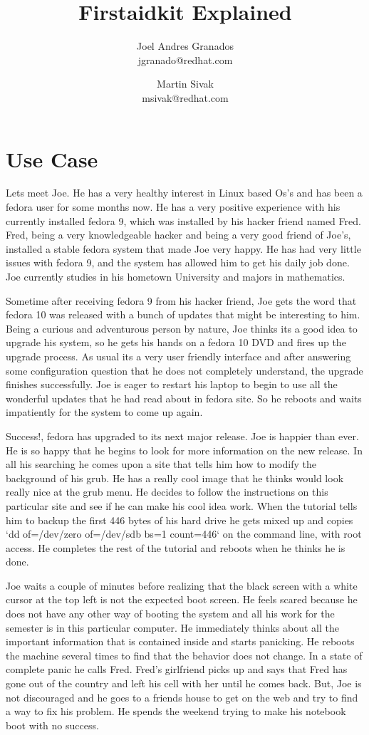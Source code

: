 \documentclass[a4paper,13pt]{article}
\title{Firstaidkit Explained}
\author{Joel Andres Granados \\ jgranado@redhat.com \and Martin Sivak \\ msivak@redhat.com}
\begin{document}
\maketitle

\section{Use Case}
Lets meet Joe.  He has a very healthy interest in Linux based Os's
and has been a fedora user for some months now.  He has a very positive
experience with his currently installed fedora 9, which was installed by his
hacker friend named Fred.  Fred, being a very knowledgeable hacker and being
a very good friend of Joe's, installed a stable fedora system that made Joe
very happy.  He has had very little issues with fedora 9, and the system has
allowed him to get his daily job done.  Joe currently studies in his hometown
University and majors in mathematics.

Sometime after receiving fedora 9 from his hacker friend, Joe gets the word
that fedora 10 was released with a bunch of updates that might be interesting
to him.  Being a curious and adventurous person by nature, Joe thinks its a good
idea to upgrade his system, so he gets his hands on a fedora 10 DVD and fires up
the upgrade process.  As usual its a very user friendly interface and after
answering some configuration question that he does not completely understand, the
upgrade finishes successfully.  Joe is eager to restart his laptop to begin to
use all the wonderful updates that he had read about in fedora site.  So he
reboots and waits impatiently for the system to come up again.

Success!, fedora has upgraded to its next major release.  Joe is happier than ever.
He is so happy that he begins to look for more information on the new release.  In
all his searching he comes upon a site that tells him how to modify the background
of his grub.  He has a really cool image that he thinks would look really nice at
the grub menu.  He decides to follow the instructions on this particular site and
see if he can make his cool idea work.  When the tutorial tells him to backup the
first 446 bytes of his hard drive he gets mixed up and copies `dd of=/dev/zero
of=/dev/sdb bs=1 count=446` on the command line, with root access.  He completes
the rest of the tutorial and reboots when he thinks he is done.

Joe waits a couple of minutes before realizing that the black screen with a white
cursor at the top left is not the expected boot screen.  He feels scared because
he does not have any other way of booting the system and all his work for the
semester is in this particular computer.  He immediately thinks about all the
important information that is contained inside and starts panicking.  He reboots
the machine several times to find that the behavior does not change.  In a state
of complete panic he calls Fred.  Fred's girlfriend picks up and says that Fred
has gone out of the country and left his cell with her until he comes back.  But,
Joe is not discouraged and he goes to a friends house to get on the web and try
to find a way to fix his problem.  He spends the weekend trying to make his
notebook boot with no success.
\end{document}
